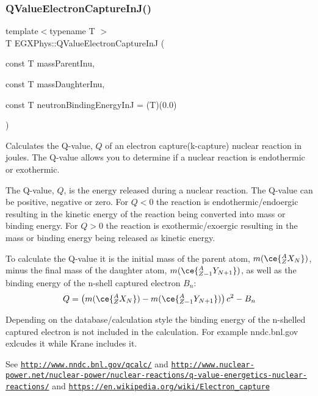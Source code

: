 \subsubsection{\texorpdfstring{Q\+Value\+Electron\+Capture\+In\+J()}{QValueElectronCaptureInJ()}}
{\footnotesize\ttfamily template$<$typename T $>$ \\
T E\+G\+X\+Phys\+::\+Q\+Value\+Electron\+Capture\+InJ (\begin{DoxyParamCaption}\item[{const T}]{mass\+Parent\+Inu,  }\item[{const T}]{mass\+Daughter\+Inu,  }\item[{const T}]{neutron\+Binding\+Energy\+InJ = {\ttfamily (T)(0.0)} }\end{DoxyParamCaption})}



Calculates the Q-\/value, $Q$ of an electron capture(k-\/capture) nuclear reaction in joules. The Q-\/value allows you to determine if a nuclear reaction is endothermic or exothermic. 

The Q-\/value, $Q$, is the energy released during a nuclear reaction. The Q-\/value can be positive, negative or zero. For $Q < 0$ the reaction is endothermic/endoergic resulting in the kinetic energy of the reaction being converted into mass or binding energy. For $Q > 0$ the reaction is exothermic/exoergic resulting in the mass or binding energy being released as kinetic energy.

To calculate the Q-\/value it is the initial mass of the parent atom, $m(\ce{ ^{A}_{Z}X_{N} })$, minus the final mass of the daughter atom, $m(\ce{ ^{A}_{Z -1}Y_{N +1} })$, as well as the binding energy of the n-\/shell captured electron $B_n$\+: \[Q = \left ( m(\ce{ ^{A}_{Z}X_{N} })-m(\ce{ ^{A}_{Z -1}Y_{N +1} }) \right) c^2-B_n\]

Depending on the database/calculation style the binding energy of the n-\/shelled captured electron is not included in the calculation. For example nndc.\+bnl.\+gov exlcudes it while Krane includes it.

See \href{http://www.nndc.bnl.gov/qcalc/}{\tt http\+://www.\+nndc.\+bnl.\+gov/qcalc/} and \href{http://www.nuclear-power.net/nuclear-power/nuclear-reactions/q-value-energetics-nuclear-reactions/}{\tt http\+://www.\+nuclear-\/power.\+net/nuclear-\/power/nuclear-\/reactions/q-\/value-\/energetics-\/nuclear-\/reactions/} and \href{https://en.wikipedia.org/wiki/Electron_capture}{\tt https\+://en.\+wikipedia.\+org/wiki/\+Electron\+\_\+capture}

